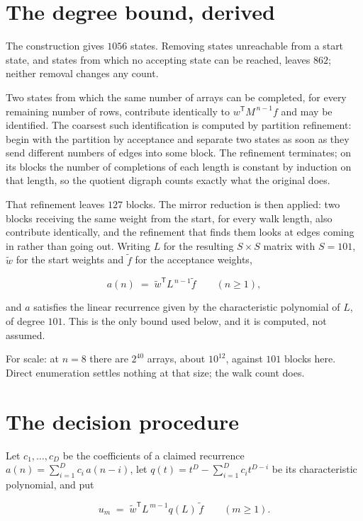 \documentclass[11pt]{article}
\theoremstyle{definition}
\begin{document}
\section{The degree bound, derived}

The construction gives $1056$ states. Removing states unreachable from a start state, and states from which no accepting state can be reached, leaves $862$; neither removal changes any count.

Two states from which the same number of arrays can be completed, for every remaining number of rows, contribute identically to $w^{\mathsf T}M^{\,n-1}f$ and may be identified. The coarsest such identification is computed by partition refinement: begin with the partition by acceptance and separate two states as soon as they send different numbers of edges into some block. The refinement terminates; on its blocks the number of completions of each length is constant by induction on that length, so the quotient digraph counts exactly what the original does.

That refinement leaves $127$ blocks. The mirror reduction is then applied: two blocks receiving the same weight from the start, for every walk length, also contribute identically, and the refinement that finds them looks at edges coming in rather than going out. Writing $L$ for the resulting $S \times S$ matrix with $S = 101$, $\tilde w$ for the start weights and $\tilde f$ for the acceptance weights,

\[a(n) \;=\; \tilde w^{\mathsf T} L^{\,n-1} \tilde f \qquad (n \ge 1),\]

and $a$ satisfies the linear recurrence given by the characteristic polynomial of $L$, of degree $101$. This is the only bound used below, and it is computed, not assumed.

For scale: at $n = 8$ there are $2^{40}$ arrays, about $10^{12}$, against $101$ blocks here. Direct enumeration settles nothing at that size; the walk count does.

\section{The decision procedure}

Let $c_1,\dots,c_D$ be the coefficients of a claimed recurrence $a(n) = \sum_{i=1}^{D} c_i\,a(n-i)$, let $q(t) = t^{D} - \sum_{i=1}^{D} c_i t^{D-i}$ be its characteristic polynomial, and put

\[u_m \;=\; \tilde w^{\mathsf T} L^{\,m-1} q(L)\,\tilde f \qquad (m \ge 1).\]
\end{document}
